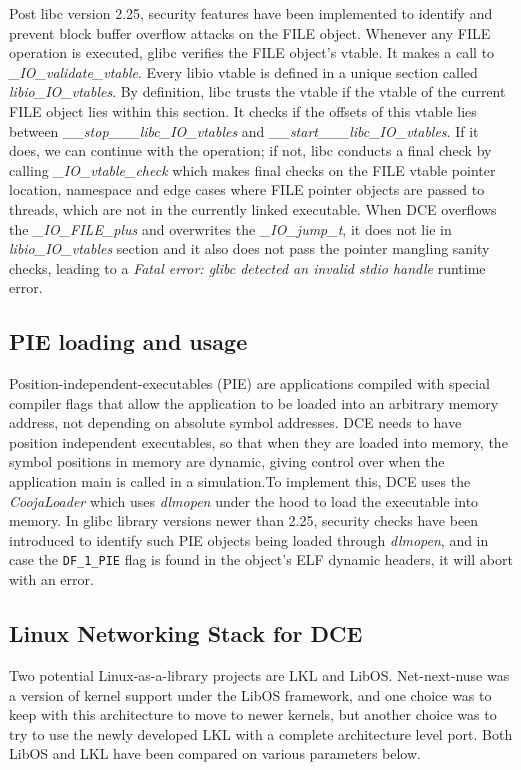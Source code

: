 \documentclass{sig-alternate}
\begin{document}
\sloppy Post libc version 2.25, security features have been implemented to identify 
and prevent block buffer overflow attacks on the FILE object. Whenever any FILE
operation is executed, glibc 
verifies the FILE object's vtable. It makes a call to 
\textit{\_IO\_validate\_vtable}. Every libio vtable is defined in a unique section called \textit{libio\_IO\_vtables}. By definition, libc trusts
the vtable if the vtable of the current FILE object lies within this section. It checks if the offsets of this vtable lies between 
\textit{\_\_stop\_\_\_libc\_IO\_vtables} and \textit{\_\_start\_\_\_libc\_IO\_vtables}.  If it does, we can continue with the operation; if not, libc 
conducts a final check by calling \textit{\_IO\_vtable\_check} which makes final checks on the FILE vtable pointer location, namespace and edge cases
where FILE pointer  objects are passed to threads, which are not in the currently linked executable.  When DCE overflows the \textit{\_IO\_FILE\_plus} and 
overwrites the \textit{\_IO\_jump\_t}, it does not lie in \textit{libio\_IO\_vtables} section and it also does not pass the pointer mangling sanity checks, leading to 
a \textit{Fatal error: glibc detected an invalid stdio handle} runtime error.

\subsection{PIE loading and usage}
Position-independent-executables (PIE) are applications compiled with special compiler flags that allow the application to be loaded into an arbitrary
memory address, not depending on absolute symbol addresses. DCE needs to have position independent executables, so that when they are loaded into memory,
the symbol positions in memory are dynamic, giving control over when the application main is called in a simulation.To implement this, DCE uses the \textit{CoojaLoader}
which uses \textit{dlmopen} under the hood to load the executable into memory. In glibc library versions newer than 2.25, security checks have been introduced to 
identify such PIE objects being loaded through \textit{dlmopen}, and in case the \texttt{DF\_1\_PIE} flag is found in the object's ELF dynamic headers, it will abort 
with an error.
 

\subsection{Linux Networking Stack for DCE}
Two potential Linux-as-a-library projects are LKL and LibOS. Net-next-nuse was a version of kernel support under the LibOS
framework, and one choice was to keep with this architecture to move to newer kernels, but another choice was to try to use the newly developed LKL with 
a complete architecture level port. Both LibOS and LKL have been compared on various parameters below.
\end{document}
